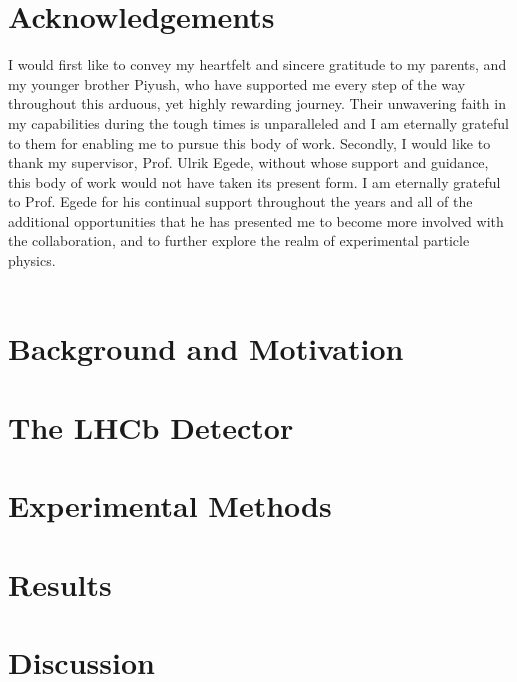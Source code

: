 \documentclass[11.5pt]{report}
\begin{document}
\chapter*{Acknowledgements}
I would first like to convey my heartfelt and sincere gratitude to my parents, and my younger brother Piyush, who have supported me every step of the way throughout this arduous, yet highly rewarding journey. Their unwavering faith in my capabilities during the tough times is unparalleled and I am eternally grateful to them for enabling me to pursue this body of work. 
Secondly, I would like to thank my supervisor, Prof. Ulrik Egede, without whose support and guidance, this body of work would not have taken its present form. I am eternally grateful to Prof. Egede for his continual support throughout the years and all of the additional opportunities that he has presented me to become more involved with the collaboration, and to further explore the realm of experimental particle physics. \\
\\

\newpage
\tableofcontents

\setlength{\parskip}{1em}
\renewcommand{\baselinestretch}{1.5}

\newpage

\chapter{Background and Motivation}


\chapter{The LHCb Detector}

\chapter{Experimental Methods}

\chapter{Results}
\chapter{Discussion}
\


\end{document}
